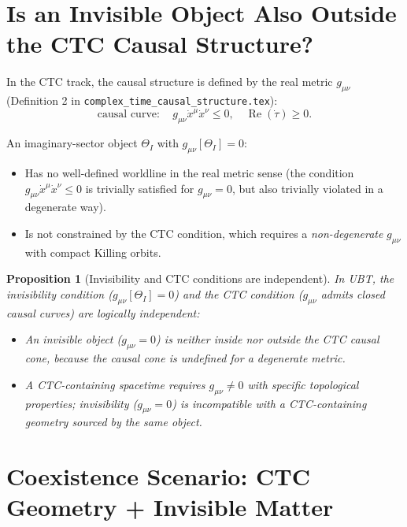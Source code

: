 \documentclass[12pt]{article}
\newtheorem{proposition}{Proposition}
\begin{document}
\section{Is an Invisible Object Also Outside the CTC Causal Structure?}

In the CTC track, the causal structure is defined by the real metric
$g_{\mu\nu}$ (Definition 2 in \texttt{complex\_time\_causal\_structure.tex}):
\begin{equation}
  \text{causal curve}: \quad g_{\mu\nu}\dot{x}^\mu\dot{x}^\nu \leq 0,
  \quad \operatorname{Re}(\dot\tau) \geq 0.
\end{equation}

An imaginary-sector object $\Theta_I$ with $g_{\mu\nu}[\Theta_I] = 0$:
\begin{itemize}
  \item Has no well-defined worldline in the real metric sense (the
    condition $g_{\mu\nu}\dot{x}^\mu\dot{x}^\nu \leq 0$ is trivially
    satisfied for $g_{\mu\nu} = 0$, but also trivially violated in
    a degenerate way).
  \item Is not constrained by the CTC condition, which requires a
    \emph{non-degenerate} $g_{\mu\nu}$ with compact Killing orbits.
\end{itemize}

\begin{proposition}[Invisibility and CTC conditions are independent]
\label{prop:independent}
In UBT, the invisibility condition ($g_{\mu\nu}[\Theta_I] = 0$)
and the CTC condition ($g_{\mu\nu}$ admits closed causal curves)
are logically independent:
\begin{itemize}
  \item An invisible object ($g_{\mu\nu} = 0$) is neither inside
    nor outside the CTC causal cone, because the causal cone is
    undefined for a degenerate metric.
  \item A CTC-containing spacetime requires $g_{\mu\nu} \neq 0$
    with specific topological properties; invisibility
    ($g_{\mu\nu} = 0$) is incompatible with a CTC-containing
    geometry sourced by the same object.
\end{itemize}
\end{proposition}

\section{Coexistence Scenario: CTC Geometry + Invisible Matter}
\end{document}
